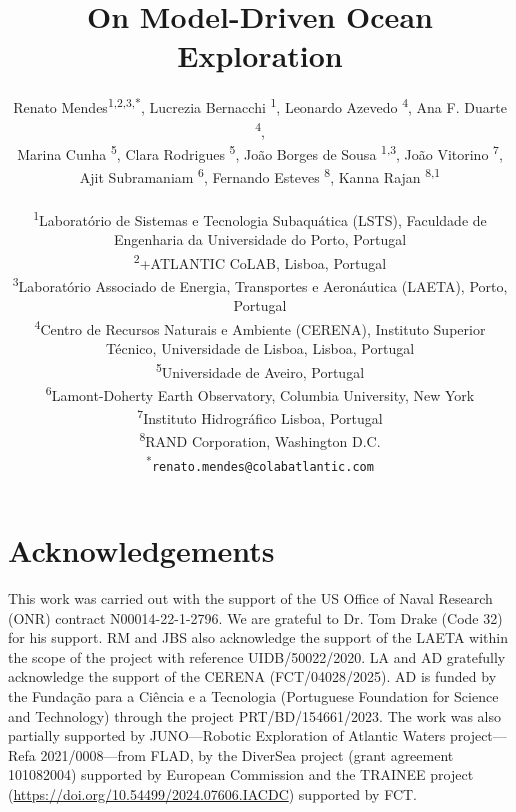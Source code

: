 \documentclass[11pt]{article}
\title{On Model-Driven Ocean Exploration}
\author{
Renato Mendes\textsuperscript{1,2,3,*},
Lucrezia Bernacchi \textsuperscript{1},
Leonardo Azevedo \textsuperscript{4},
Ana F. Duarte \textsuperscript{4},\\
Marina Cunha \textsuperscript{5},
Clara Rodrigues \textsuperscript{5},
Jo\~{a}o Borges de Sousa \textsuperscript{1,3},
Jo\~{a}o Vitorino \textsuperscript{7},\\
Ajit Subramaniam \textsuperscript{6},
Fernando Esteves \textsuperscript{8},
Kanna Rajan \textsuperscript{8,1}
\\
\\
\textsuperscript{1}{\scriptsize Laboratório de Sistemas e Tecnologia Subaquática (LSTS), Faculdade de Engenharia da Universidade do Porto, Portugal}\\
\textsuperscript{2}{\scriptsize +ATLANTIC CoLAB, Lisboa, Portugal}\\
\textsuperscript{3}{\scriptsize Laboratório Associado de Energia, Transportes e Aeronáutica (LAETA), Porto, Portugal}\\
\textsuperscript{4}{\scriptsize Centro de Recursos Naturais e Ambiente (CERENA), Instituto Superior T\'{e}cnico, Universidade de Lisboa, Lisboa, Portugal}\\
\textsuperscript{5}{\scriptsize Universidade de Aveiro, Portugal}\\
\textsuperscript{6}{\scriptsize Lamont-Doherty Earth Observatory, Columbia University, New York}\\
\textsuperscript{7}{\scriptsize Instituto Hidrogr{\'a}fico Lisboa, Portugal}\\
\textsuperscript{8}{\scriptsize RAND Corporation, Washington D.C.}\\
\textsuperscript{*}\texttt{{\scriptsize renato.mendes@colabatlantic.com}}
}
\date{}
\begin{document}
\maketitle






\section{Acknowledgements}

This work was carried out with the support of the US Office of Naval
Research (ONR) contract N00014-22-1-2796. We are grateful to Dr. Tom
Drake (Code 32) for his support. RM and JBS also acknowledge the
support of the LAETA within the scope of the project with reference
UIDB/50022/2020. LA and AD gratefully acknowledge the support of the
CERENA (FCT/04028/2025). AD is funded by the Funda\c{c}\~{a}o para a
Ci\^{e}ncia e a Tecnologia (Portuguese Foundation for Science and
Technology) through the project PRT/BD/154661/2023. The work was also
partially supported by JUNO—Robotic Exploration of Atlantic Waters
project—Refa 2021/0008—from FLAD, by the DiverSea project (grant
agreement 101082004) supported by European Commission and the TRAINEE
project (\url{https://doi.org/10.54499/2024.07606.IACDC}) supported by
FCT.


\footnotesize{
  
}
\end{document}
